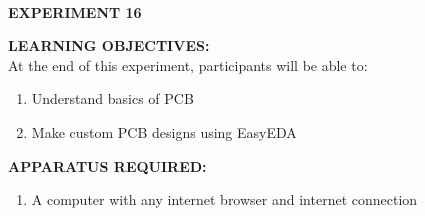 \documentclass[12pt,a4paper]{article}
\begin{document}
\begin{center}

\textbf{\large \\EXPERIMENT 16}\\[6pt]
\end{center}

\textbf{\large LEARNING OBJECTIVES:}\\[3pt]
At the end of this experiment, participants will be able to:\vspace{-6mm}\begin{enumerate}
 \setlength\itemsep{-0.3em}
\item Understand basics of PCB \\
\item Make custom PCB designs using EasyEDA
\end{enumerate}
\textbf{\large APPARATUS REQUIRED:}\\
\vspace{-3mm}
\begin{enumerate}
 \setlength\itemsep{-0.3em}
\item A computer with any internet browser and internet connection\\
\end{enumerate}
\end{document}
